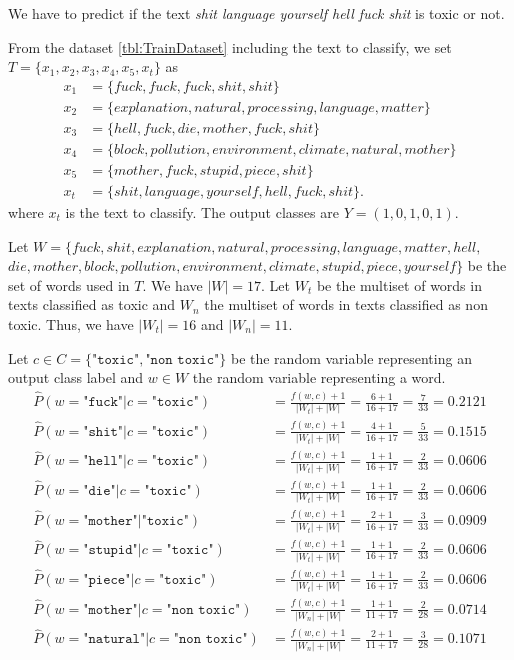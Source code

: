 \documentclass{article}
\begin{document}
We have to predict if the text \textit{shit language yourself hell fuck shit} is toxic or not.

From the dataset \ref{tbl:TrainDataset} including the text to classify, we set $T = \{x_1, x_2, x_3, x_4, x_5, x_t\}$ as
\begin{align*}
	x_1 &= \{fuck, fuck, fuck, shit, shit\} \\
	x_2 &= \{explanation, natural, processing, language, matter\} \\
	x_3 &= \{hell, fuck, die, mother, fuck, shit\} \\
	x_4 &= \{block, pollution, environment, climate, natural, mother\} \\
	x_5 &= \{mother, fuck, stupid, piece, shit\} \\
	x_t &= \{shit, language, yourself, hell, fuck, shit\}.
\end{align*}
where $x_t$ is the text to classify. The output classes are $Y = (1,0,1,0,1)$.

Let $W = \{fuck, shit, explanation, natural, processing, language, matter, hell,$ $ die, mother, block, pollution, environment, climate, stupid, piece, yourself\}$ be the set of words used in $T$. We have $|W| = 17$. Let $W_t$ be the multiset of words in texts classified as toxic and $W_n$ the multiset of words in texts classified as non toxic. Thus, we have $|W_t| = 16$ and $|W_n| = 11$.

Let $c \in C = \{\texttt{"toxic"}, \texttt{"non toxic"}\}$ be the random variable representing an output class label and $w \in W$ the random variable representing a word.
\begin{align*}
	\widehat{P}(w = \texttt{"fuck"} | c = \texttt{"toxic"}) &= \frac{f(w, c)+1}{|W_t| + |W|} = \frac{6 + 1}{16 + 17} = \frac{7}{33} = 0.2121 \\
	\widehat{P}(w = \texttt{"shit"} | c = \texttt{"toxic"}) &= \frac{f(w, c)+1}{|W_t| + |W|} = \frac{4 + 1}{16 + 17} = \frac{5}{33} = 0.1515 \\
	\widehat{P}(w = \texttt{"hell"} | c = \texttt{"toxic"}) &= \frac{f(w, c)+1}{|W_t| + |W|} = \frac{1 + 1}{16 + 17} = \frac{2}{33} = 0.0606 \\
	\widehat{P}(w = \texttt{"die"} | c = \texttt{"toxic"}) &= \frac{f(w, c)+1}{|W_t| + |W|} = \frac{1 + 1}{16 + 17} = \frac{2}{33} = 0.0606 \\
	\widehat{P}(w = \texttt{"mother"} | \texttt{"toxic"}) &= \frac{f(w, c)+1}{|W_t| + |W|} = \frac{2 + 1}{16 + 17} = \frac{3}{33} = 0.0909 \\
	\widehat{P}(w = \texttt{"stupid"} | c = \texttt{"toxic"}) &= \frac{f(w, c)+1}{|W_t| + |W|} = \frac{1 + 1}{16 + 17} = \frac{2}{33} = 0.0606 \\
	\widehat{P}(w = \texttt{"piece"} | c = \texttt{"toxic"}) &= \frac{f(w, c)+1}{|W_t| + |W|} = \frac{1 + 1}{16 + 17} = \frac{2}{33} = 0.0606 \\
	\widehat{P}(w = \texttt{"mother"} | c = \texttt{"non toxic"}) &= \frac{f(w, c)+1}{|W_n| + |W|} = \frac{1 + 1}{11 + 17} = \frac{2}{28} = 0.0714 \\
	\widehat{P}(w = \texttt{"natural"} | c = \texttt{"non toxic"}) &= \frac{f(w, c)+1}{|W_n| + |W|} = \frac{2 + 1}{11 + 17} = \frac{3}{28} = 0.1071
\end{align*}
\end{document}
